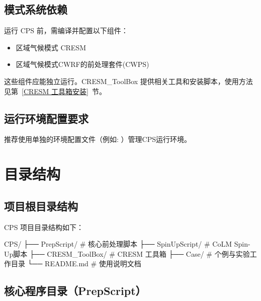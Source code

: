 \documentclass[UTF8,a4paper,11pt,fontset=none]{ctexart}
\begin{document}
\subsection{模式系统依赖}

运行 CPS 前，需编译并配置以下组件：

\begin{itemize}[leftmargin=4em]
    \item 区域气候模式 CRESM
    \item 区域气候模式CWRF的前处理套件(CWPS)
\end{itemize}

这些组件应能独立运行。CRESM\_ToolBox 提供相关工具和安装脚本，使用方法见第~\ref{CRESM 工具箱安装}~节。

\subsection{运行环境配置要求}

推荐使用单独的环境配置文件（例如: ）管理CPS运行环境。

\section{目录结构}

\subsection{项目根目录结构}

CPS 项目目录结构如下：

\begin{CPSCode}[leftmargin=2em]
    CPS/
        ├── PrepScript/          # 核心前处理脚本
        ├── SpinUpScript/        # CoLM Spin-Up脚本
        ├── CRESM_ToolBox/       # CRESM 工具箱
        ├── Case/                # 个例与实验工作目录
        └── README.md            # 使用说明文档
\end{CPSCode}

\subsection{核心程序目录（PrepScript）}
\end{document}
